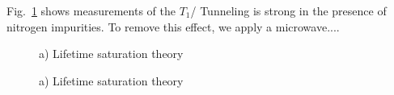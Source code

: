 \documentclass[preprintnumbers,amsmath,amssymb,twocolumn]{revtex4-1}
\begin{document}
Fig.~\ref{T1} shows measurements of the $T_1$/ Tunneling is strong in the presence of nitrogen impurities. 
To remove this effect, we apply a microwave....

\begin{figure}[!ht]
  \caption{a) 
Lifetime saturation theory
 }\label{T1}
\end{figure}


\begin{figure}[!ht]
  \caption{a) 
Lifetime saturation theory
 }
\end{figure}
\end{document}
